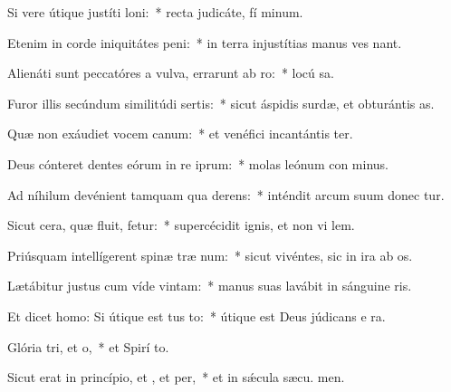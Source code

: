 \item Si vere útique justíti loni:~* recta judicáte, fí minum.
\item Etenim in corde iniquitátes peni:~* in terra injustítias manus ves nant.
\item Alienáti sunt peccatóres a vulva, errarunt ab ro:~* locú  sa.
\item Furor illis secúndum similitúdi sertis:~* sicut áspidis surdæ, et obturántis  as.
\item Quæ non exáudiet vocem canum:~* et venéfici incantántis ter.
\item Deus cónteret dentes eórum in re iprum:~* molas leónum con minus.
\item Ad níhilum devénient tamquam qua derens:~* inténdit arcum suum donec tur.
\item Sicut cera, quæ fluit, fetur:~* supercécidit ignis, et non vi lem.
\item Priúsquam intellígerent spinæ træ num:~* sicut vivéntes, sic in ira ab os.
\item Lætábitur justus cum víde vintam:~* manus suas lavábit in sánguine ris.
\item Et dicet homo: Si útique est tus to:~* útique est Deus júdicans e  ra.
\item Glória tri, et o,~* et Spirí to.
\item Sicut erat in princípio, et , et per,~* et in sǽcula sæcu. men.
